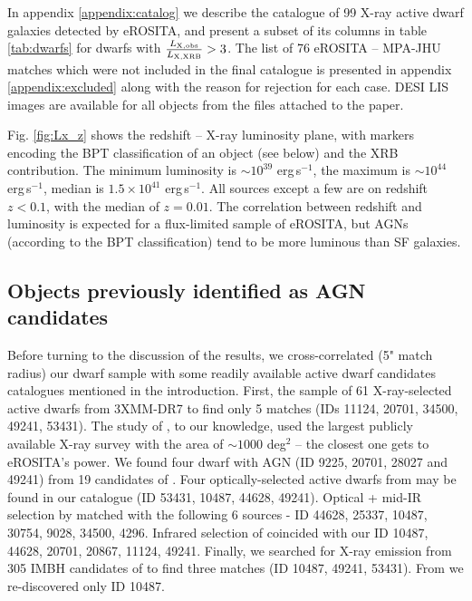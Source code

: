 \documentclass[fleqn,usenatbib]{mnras}
\newcommand{\ergps}{erg\,s$^{-1}$}
\newcommand{\lxlxrbrat}{\frac{L_{\rm X, obs}}{L_{\rm X, XRB}}}
\begin{document}
In appendix \ref{appendix:catalog} we describe the catalogue  of 99 X-ray active  dwarf galaxies detected by eROSITA, and present a subset of its  columns in table \ref{tab:dwarfs} for dwarfs with $\lxlxrbrat>3$.
The list of 76 eROSITA -- MPA-JHU matches which were not included in the final catalogue is presented in appendix \ref{appendix:excluded} along with the reason for rejection for each case. DESI LIS images are available for all objects from the files attached to the paper.

Fig. \ref{fig:Lx_z} shows the redshift -- X-ray luminosity  plane, with markers encoding the BPT classification of an object (see below) and the XRB contribution. The minimum luminosity is $\sim10^{39}$ \ergps,  the maximum is $\sim10^{44} $ \ergps, median is $1.5\times10^{41}$ \ergps. All sources except a few are on redshift $z<0.1$, with the median of $z=0.01$. The correlation between redshift and luminosity is expected for a flux-limited sample of eROSITA, but AGNs (according to the BPT classification) tend to be more luminous than SF galaxies.

\subsection{Objects previously identified as AGN candidates}
\label{sect:results:known_dwarfs}

Before turning to the discussion of the results, we cross-correlated (5" match radius) our dwarf sample with some readily available active dwarf candidates catalogues mentioned in the introduction. First,  the sample of 61 X-ray-selected active dwarfs from  3XMM-DR7 \citep{Birchall2020} to find only 5 matches (IDs 11124, 20701, 34500, 49241, 53431).  The study of \citeauthor{Birchall2020}, to our knowledge, used the largest publicly available X-ray survey with the area of $\sim1000$ deg$^2$ -- the closest one gets to eROSITA's power. We found four dwarf with AGN (ID 9225, 20701, 28027 and 49241) from 19 candidates of  \citet{Lemons2015}. Four optically-selected active dwarfs from \citet{Reines2013} may be found in our catalogue  (ID 53431, 10487, 44628, 49241). Optical + mid-IR selection by \citet{Sartori2015} matched with the following 6 sources - ID 44628, 25337, 10487, 30754, 9028, 34500, 4296. Infrared selection of \citet{Marleau2017} coincided with our ID 10487, 44628, 20701, 20867, 11124, 49241. Finally, we searched for X-ray emission from 305 IMBH candidates of  \citealt{Chilingarian2018} to find three matches (ID 10487, 49241, 53431). From \citet{Greene2007} we re-discovered only ID 10487.
\end{document}
